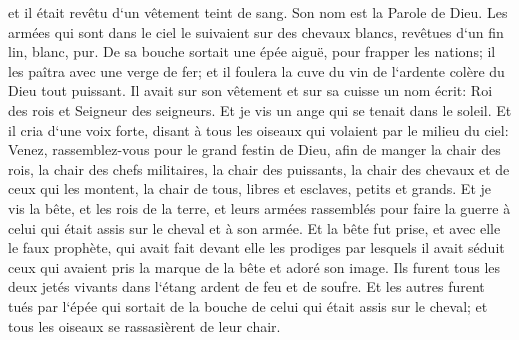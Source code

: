 \verse et il était revêtu d`un vêtement teint de sang. Son nom est la Parole de Dieu. 
\verse Les armées qui sont dans le ciel le suivaient sur des chevaux blancs, revêtues d`un fin lin, blanc, pur. 
\verse De sa bouche sortait une épée aiguë, pour frapper les nations; il les paîtra avec une verge de fer; et il foulera la cuve du vin de l`ardente colère du Dieu tout puissant. 
\verse Il avait sur son vêtement et sur sa cuisse un nom écrit: Roi des rois et Seigneur des seigneurs. 
\verse Et je vis un ange qui se tenait dans le soleil. Et il cria d`une voix forte, disant à tous les oiseaux qui volaient par le milieu du ciel: Venez, rassemblez-vous pour le grand festin de Dieu, 
\verse afin de manger la chair des rois, la chair des chefs militaires, la chair des puissants, la chair des chevaux et de ceux qui les montent, la chair de tous, libres et esclaves, petits et grands. 
\verse Et je vis la bête, et les rois de la terre, et leurs armées rassemblés pour faire la guerre à celui qui était assis sur le cheval et à son armée. 
\verse Et la bête fut prise, et avec elle le faux prophète, qui avait fait devant elle les prodiges par lesquels il avait séduit ceux qui avaient pris la marque de la bête et adoré son image. Ils furent tous les deux jetés vivants dans l`étang ardent de feu et de soufre. 
\verse Et les autres furent tués par l`épée qui sortait de la bouche de celui qui était assis sur le cheval; et tous les oiseaux se rassasièrent de leur chair. 

